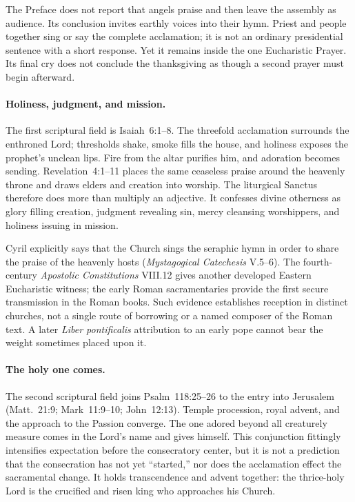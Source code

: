 
The Preface does not report that angels praise and then leave the assembly as audience. Its conclusion invites earthly voices into their hymn. Priest and people together sing or say the complete acclamation; it is not an ordinary presidential sentence with a short response. Yet it remains inside the one Eucharistic Prayer. Its final cry does not conclude the thanksgiving as though a second prayer must begin afterward.

\paragraph{Holiness, judgment, and mission.}
The first scriptural field is Isaiah~6:1--8. The threefold acclamation surrounds the enthroned Lord; thresholds shake, smoke fills the house, and holiness exposes the prophet's unclean lips. Fire from the altar purifies him, and adoration becomes sending. Revelation~4:1--11 places the same ceaseless praise around the heavenly throne and draws elders and creation into worship. The liturgical Sanctus therefore does more than multiply an adjective. It confesses divine otherness as glory filling creation, judgment revealing sin, mercy cleansing worshippers, and holiness issuing in mission.

Cyril explicitly says that the Church sings the seraphic hymn in order to share the praise of the heavenly hosts (\emph{Mystagogical Catechesis} V.5--6). The fourth-century \emph{Apostolic Constitutions} VIII.12 gives another developed Eastern Eucharistic witness; the early Roman sacramentaries provide the first secure transmission in the Roman books. Such evidence establishes reception in distinct churches, not a single route of borrowing or a named composer of the Roman text. A later \emph{Liber pontificalis} attribution to an early pope cannot bear the weight sometimes placed upon it.

\paragraph{The holy one comes.}
The second scriptural field joins Psalm~118:25--26 to the entry into Jerusalem (Matt.~21:9; Mark~11:9--10; John~12:13). Temple procession, royal advent, and the approach to the Passion converge. The one adored beyond all creaturely measure comes in the Lord's name and gives himself. This conjunction fittingly intensifies expectation before the consecratory center, but it is not a prediction that the consecration has not yet ``started,'' nor does the acclamation effect the sacramental change. It holds transcendence and advent together: the thrice-holy Lord is the crucified and risen king who approaches his Church.

